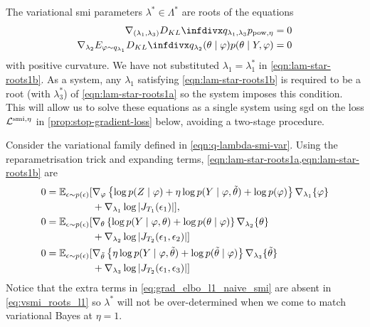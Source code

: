 \begin{remark}\label{remk:var-smi-roots}
  The variational \acrshort*{smi} parameters $\lambda^*\in\Lambda^*$ are roots of the equations
  \begin{align}
    \nabla_{(\lambda_1,\lambda_3)}\kl{q_{\lambda_1,\lambda_3}}{p_{\pow, \eta}}                                       & =0 \label{eqn:lam-star-roots1a} \\
    \nabla_{\lambda_2} E_{\varphi\sim q_{\lambda_1}}\kl{q_{\lambda_2}(\theta\mid \varphi)}{p(\theta \mid Y,\varphi)} & =0\label{eqn:lam-star-roots1b}
  \end{align}
  with positive curvature.
  We have not substituted $\lambda_1=\lambda^*_1$ in \cref{eqn:lam-star-roots1b}. As a system, any $\lambda_1$ satisfying \cref{eqn:lam-star-roots1b} is required to be a root (with $\lambda^*_3$) of \cref{eqn:lam-star-roots1a} so the system imposes this condition. This will allow us to solve these equations as a single system using \acrshort*{sgd} on the loss $\mathcal{L}^{\operatorname{\text{smi}},\eta}$ in \cref{prop:stop-gradient-loss} below, avoiding a two-stage procedure.
\end{remark}

\begin{remark}\label{remk:var-smi-roots-gradients}
  Consider the variational family defined in \cref{eqn:q-lambda-smi-var}.
  Using the reparametrisation trick and expanding terms, \cref{eqn:lam-star-roots1a,eqn:lam-star-roots1b} are
  \begin{align}
    0 = \operatorname{\mathbb{E}}_{\epsilon \sim p(\epsilon)}[ & \nabla_{\varphi} \left\{ \log p(Z \mid \varphi) + \eta \log p(Y \mid \varphi, \tilde\theta) + \log p(\varphi) \right\} \nabla_{\lambda_1} \{ \varphi \} \nonumber
    \\
                                        & + \nabla_{\lambda_1} \log \left\vert J_{T_1}(\epsilon_1) \right\vert  ],  \label{eq:vsmi_roots_l1}                                                                   \\
    0 = \operatorname{\mathbb{E}}_{\epsilon \sim p(\epsilon)}[ & \nabla_{\theta} \left\{ \log p(Y \mid \varphi, \theta) + \log p(\theta \mid \varphi) \right\} \nabla_{\lambda_2} \{ \theta \} \nonumber                              \\
                                        & + \nabla_{\lambda_2} \log \left\vert J_{T_2}(\epsilon_1,\epsilon_2) \right\vert  ] \label{eq:vsmi_roots_l2}                                                          \\
    0 = \operatorname{\mathbb{E}}_{\epsilon \sim p(\epsilon)}[ & \nabla_{\tilde\theta} \left\{ \eta \log p(Y \mid \varphi, \tilde\theta) + \log p(\tilde\theta \mid \varphi) \right\} \nabla_{\lambda_3} \{ \tilde\theta \} \nonumber \\
                                        & + \nabla_{\lambda_3} \log \left\vert J_{T_2}(\epsilon_1,\epsilon_3) \right\vert  ] \label{eq:vsmi_roots_l3}
  \end{align}
  Notice that the extra terms in \cref{eq:grad_elbo_l1_naive_smi} are absent in \cref{eq:vsmi_roots_l1} so $\lambda^*$ will not be over-determined when we come to match variational Bayes at $\eta=1$.
\end{remark}

